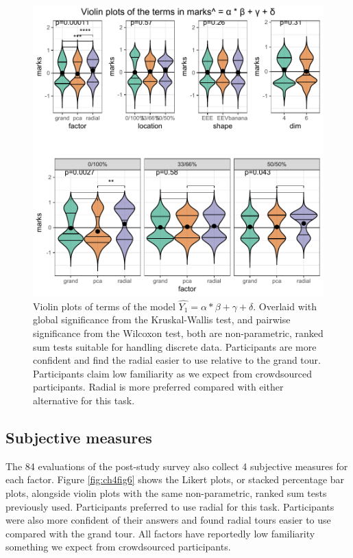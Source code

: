 \documentclass{template/monashthesis}
\begin{document}
\begin{figure}

{\centering \includegraphics[width=1\linewidth,]{./figures_from_script/ch4_fig5_ABcd_violins} 

}

\caption{Violin plots of terms of the model $\widehat{Y_1} = \alpha * \beta + \gamma + \delta$. Overlaid with global significance from the Kruskal-Wallis test, and pairwise significance from the Wilcoxon test, both are non-parametric, ranked sum tests suitable for handling discrete data. Participants are more confident and find the radial easier to use relative to the grand tour. Participants claim low familiarity as we expect from crowdsourced participants. Radial is more preferred compared with either alternative for this task.}\label{fig:ch4fig5}
\end{figure}

\hypertarget{subjective-measures}{%
\subsection{Subjective measures}\label{subjective-measures}}

The 84 evaluations of the post-study survey also collect 4 subjective measures for each factor. Figure \ref{fig:ch4fig6} shows the Likert plots, or stacked percentage bar plots, alongside violin plots with the same non-parametric, ranked sum tests previously used. Participants preferred to use radial for this task. Participants were also more confident of their answers and found radial tours easier to use compared with the grand tour. All factors have reportedly low familiarity something we expect from crowdsourced participants.
\end{document}
